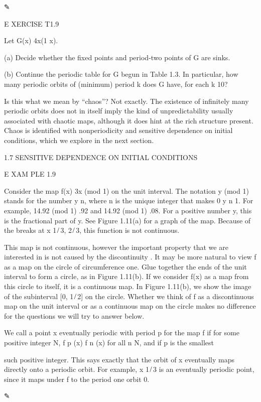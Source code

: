 ✎

E XERCISE T1.9

Let G(x)  4x(1  x).

(a) Decide whether the ﬁxed points and period-two points of G are sinks.

(b) Continue the periodic table for G begun in Table 1.3. In particular, how many periodic orbits of 
(minimum) period k does G have, for each k 10?

Is this what we mean by “chaos”? Not exactly. The existence of inﬁnitely many periodic orbits does not in 
itself imply the kind of unpredictability usually associated with chaotic maps, although it does hint at 
the rich structure present. Chaos is identiﬁed with nonperiodicity and sensitive dependence on initial 
conditions, which we explore in the next section.

1.7 SENSITIVE DEPENDENCE ON INITIAL CONDITIONS

E XAM PLE 1.9

Consider the map f(x)  3x (mod 1) on the unit interval. The notation y (mod 1) stands for the number y n, 
where n is the unique integer that makes 0 y n    1. For example, 14.92 (mod 1)  .92 and 14.92 (mod 1)  
.08. For a positive number y, this is the fractional part of y. See Figure 1.11(a) for a graph of the map. 
Because of the breaks at x  1 ̸ 3, 2 ̸ 3, this function is not continuous.

This map is not continuous, however the important property that we are interested in is not caused by the 
discontinuity . It may be more natural to view f as a map on the circle of circumference one. Glue together 
the ends of the unit interval to form a circle, as in Figure 1.11(b). If we consider f(x) as a map from 
this circle to itself, it is a continuous map. In Figure 1.11(b), we show the image of the subinterval [0, 
1 ̸ 2] on the circle. Whether we think of f as a discontinuous map on the unit interval or as a continuous 
map on the circle makes no difference for the questions we will try to answer below.

We call a point x eventually periodic with period p for the map f if for some positive integer N, f p (x)  
f n (x) for all n 
 N, and if p is the smallest

such positive integer. This says exactly that the orbit of x eventually maps directly onto a periodic 
orbit. For example, x  1 ̸ 3 is an eventually periodic point, since it maps under f to the period one orbit 
0.

✎

